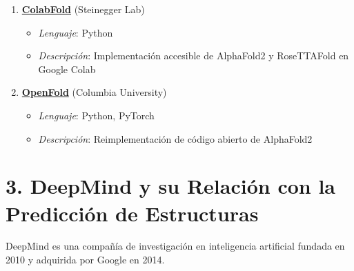 \documentclass[11pt,a4paper]{article}
\begin{document}
\begin{enumerate}[noitemsep,topsep=0pt,leftmargin=*]
    \item \textbf{\href{https://github.com/sokrypton/ColabFold}{ColabFold}} (Steinegger Lab)
    \begin{itemize}[noitemsep,topsep=0pt]
      \item \textit{Lenguaje}: Python
      \item \textit{Descripción}: Implementación accesible de AlphaFold2 y RoseTTAFold en Google Colab
    \end{itemize}
    
    \item \textbf{\href{https://github.com/aqlaboratory/openfold}{OpenFold}} (Columbia University)
    \begin{itemize}[noitemsep,topsep=0pt]
      \item \textit{Lenguaje}: Python, PyTorch
      \item \textit{Descripción}: Reimplementación de código abierto de AlphaFold2
    \end{itemize}
  \end{enumerate}
  
  \section*{3. DeepMind y su Relación con la Predicción de Estructuras}
  
  \noindent DeepMind es una compañía de investigación en inteligencia artificial fundada en 2010 y adquirida por Google en 2014.
  
\end{document}

